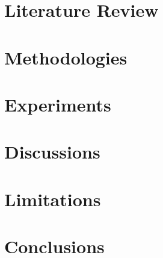 \documentclass[a4paper]{ustthesis}
\begin{document}
% 

\chapter{Literature Review}
\label{chapter_review}

\newpage

\chapter{Methodologies}
\label{chapter_methodologies}

\newpage

\chapter{Experiments}
\label{chapter_experiments}

\newpage

\chapter{Discussions}
\label{chapter_discussions}

\newpage

\chapter{Limitations}
\label{chapter_limitations}

\newpage

\chapter{Conclusions}
\label{chapter_conclusions}

\newpage

%
%
%


\newpage
\end{document}
